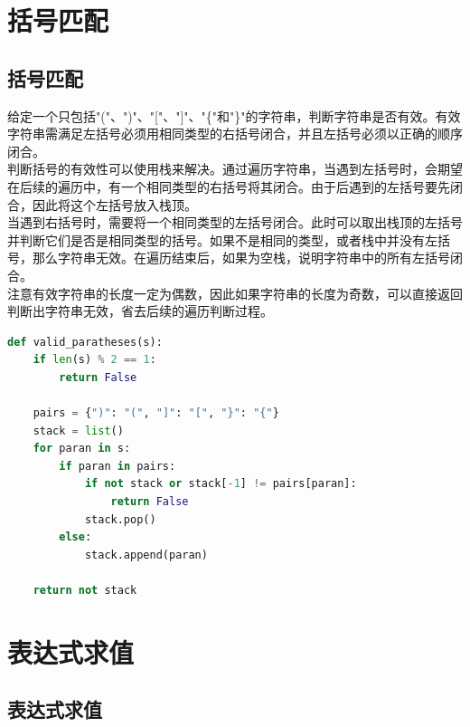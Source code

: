 \newpage

\section{括号匹配}

\subsection{括号匹配}

给定一个只包括"("、")"、"["、"]"、"\{"和"\}"的字符串，判断字符串是否有效。有效字符串需满足左括号必须用相同类型的右括号闭合，并且左括号必须以正确的顺序闭合。 \\

判断括号的有效性可以使用栈来解决。通过遍历字符串，当遇到左括号时，会期望在后续的遍历中，有一个相同类型的右括号将其闭合。由于后遇到的左括号要先闭合，因此将这个左括号放入栈顶。 \\

当遇到右括号时，需要将一个相同类型的左括号闭合。此时可以取出栈顶的左括号并判断它们是否是相同类型的括号。如果不是相同的类型，或者栈中并没有左括号，那么字符串无效。在遍历结束后，如果为空栈，说明字符串中的所有左括号闭合。 \\

注意有效字符串的长度一定为偶数，因此如果字符串的长度为奇数，可以直接返回判断出字符串无效，省去后续的遍历判断过程。 \\


\begin{lstlisting}[language=Python]
def valid_paratheses(s):
    if len(s) % 2 == 1:
        return False
    
    pairs = {")": "(", "]": "[", "}": "{"}
    stack = list()
    for paran in s:
        if paran in pairs:
            if not stack or stack[-1] != pairs[paran]:
                return False
            stack.pop()
        else:
            stack.append(paran)

    return not stack
\end{lstlisting}

\newpage

\section{表达式求值}

\subsection{表达式求值}

